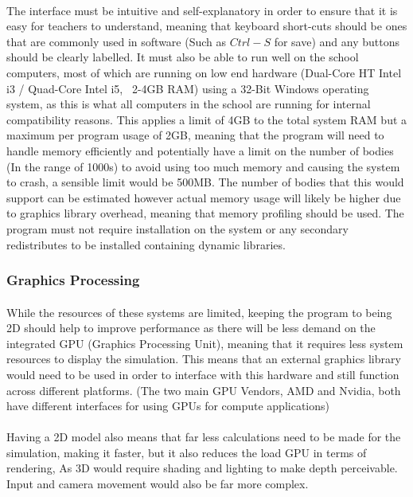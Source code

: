 \paragraph{}
The interface must be intuitive and self-explanatory in order to ensure that it is easy for teachers to understand, meaning that keyboard short-cuts should be ones that are commonly used in software (Such as $Ctrl-S$ for save) and any buttons should be clearly labelled. It must also be able to run well on the school computers, most of which are running on low end hardware (Dual-Core HT Intel i3 / Quad-Core Intel i5, ~2-4GB RAM) using a 32-Bit Windows operating system, as this is what all computers in the school are running for internal compatibility reasons. This applies a limit of 4GB to the total system RAM but a maximum per program usage of 2GB, meaning that the program will need to handle memory efficiently and potentially have a limit on the number of bodies (In the range of 1000s) to avoid using too much memory and causing the system to crash, a sensible limit would be 500MB. The number of bodies that this would support can be estimated however actual memory usage will likely be higher due to graphics library overhead, meaning that memory profiling should be used. The program must not require installation on the system or any secondary redistributes to be installed containing dynamic libraries.

\subsubsection{Graphics Processing}

\paragraph{}
While the resources of these systems are limited, keeping the program to being 2D should help to improve performance as there will be less demand on the integrated GPU (Graphics Processing Unit), meaning that it requires less system resources to display the simulation. This means that an external graphics library would need to be used in order to interface with this hardware and still function across different platforms. (The two main GPU Vendors, AMD and Nvidia, both have different interfaces for using GPUs for compute applications) 

\paragraph{}Having a 2D model also means that far less calculations need to be made for the simulation, making it faster, but it also reduces the load GPU in terms of rendering, As 3D would require shading and lighting to make depth perceivable. Input and camera movement would also be far more complex.

